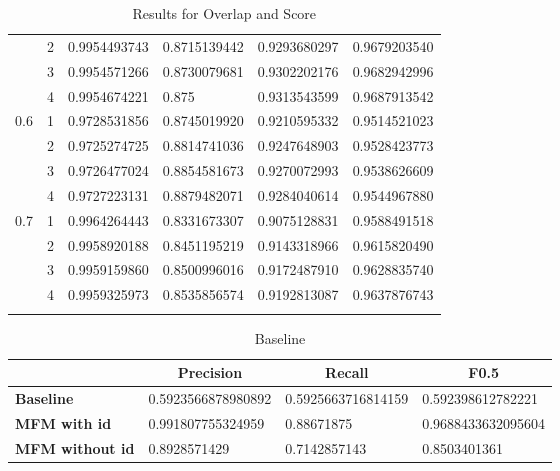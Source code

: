\begin{longtable}{l|l|l|l|l|l}
& 2 & 0.9954493743 & 0.8715139442 & 0.9293680297 & 0.9679203540 \\ \hhline{~-----}
& 3 & 0.9954571266 & 0.8730079681 & 0.9302202176 & 0.9682942996 \\ \hhline{~-----}
& 4 & 0.9954674221 & 0.875        & 0.9313543599 & 0.9687913542 \\ \hline
 \hline
\multirow{4}{*}{0.6}& 1 & 0.9728531856 & 0.8745019920 & 0.9210595332 & 0.9514521023 \\ \hhline{~-----}
& 2 & 0.9725274725 & 0.8814741036 & 0.9247648903 & 0.9528423773 \\ \hhline{~-----}
& 3 & 0.9726477024 & 0.8854581673 & 0.9270072993 & 0.9538626609 \\ \hhline{~-----}
& 4 & 0.9727223131 & 0.8879482071 & 0.9284040614 & 0.9544967880 \\ \hline
 \hline
\multirow{4}{*}{0.7}& 1 & 0.9964264443 & 0.8331673307 & 0.9075128831 & 0.9588491518 \\ \hhline{~-----}
& 2 & 0.9958920188 & 0.8451195219 & 0.9143318966 & 0.9615820490 \\ \hhline{~-----}
& 3 & 0.9959159860 & 0.8500996016 & 0.9172487910 & 0.9628835740 \\ \hhline{~-----}
& 4 & 0.9959325973 & 0.8535856574 & 0.9192813087 & 0.9637876743 \\ \hline

\caption{Results for Overlap and Score}
\label{tab_overlapScore}
\end{longtable}



\begin{table}[h!]
\begin{tabular}{l||l|l|l}
 &  \multicolumn{1}{|c|}{\bfseries Precision} &  \multicolumn{1}{|c|}{\bfseries Recall} &  \multicolumn{1}{|c}{\bfseries F0.5}
\\ \hline \hline

\textbf{Baseline}       & 0.5923566878980892 & 0.5925663716814159 & 0.592398612782221 \\ \hline
\textbf{MFM with id}    & 0.991807755324959 & 0.88671875 & 0.9688433632095604 \\ \hline
\textbf{MFM without id} & 0.8928571429 & 0.7142857143 & 0.8503401361 \\ \hline

\end{tabular}
\caption{Baseline}
\end{table}

